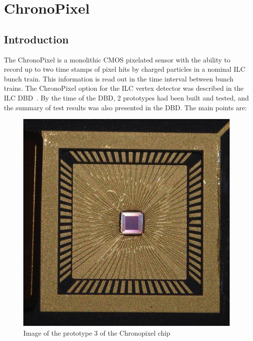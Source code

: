 \section{ChronoPixel}

\subsection{Introduction}
The ChronoPixel is a monolithic CMOS pixelated sensor with the ability to record up to two time stamps of pixel hits by charged particles in a nominal ILC bunch train. This information is read out in the time interval between bunch trains. The ChronoPixel option for the ILC vertex detector was described in the ILC DBD~\cite{2011arXiv1109.2811B}. By the time of the DBD, 2 prototypes had been built and tested, and the summary of test results was also presented in the DBD. The main points are:
\begin{figure}
    \centering
    \includegraphics[width=.5\linewidth]{VertexDetector/Chronopix/Chronopix_image}
    \caption{Image of the prototype 3 of the Chronopixel chip}
    \label{fig:chronopix}
\end{figure}
